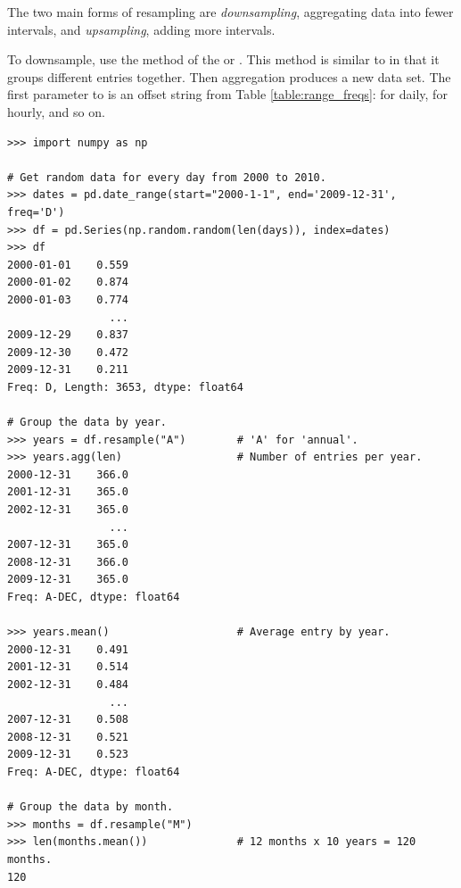 The two main forms of resampling are \emph{downsampling}, aggregating data into fewer intervals, and \emph{upsampling}, adding more intervals.

To downsample, use the  method of the  or .
This method is similar to  in that it groups different entries together.
Then aggregation produces a new data set.
The first parameter to  is an offset string from Table \ref{table:range_freqs}:  for daily,  for hourly, and so on.

\begin{lstlisting}
>>> import numpy as np

# Get random data for every day from 2000 to 2010.
>>> dates = pd.date_range(start="2000-1-1", end='2009-12-31', freq='D')
>>> df = pd.Series(np.random.random(len(days)), index=dates)
>>> df
2000-01-01    0.559
2000-01-02    0.874
2000-01-03    0.774
                ...
2009-12-29    0.837
2009-12-30    0.472
2009-12-31    0.211
Freq: D, Length: 3653, dtype: float64

# Group the data by year.
>>> years = df.resample("A")        # 'A' for 'annual'.
>>> years.agg(len)                  # Number of entries per year.
2000-12-31    366.0
2001-12-31    365.0
2002-12-31    365.0
                ...
2007-12-31    365.0
2008-12-31    366.0
2009-12-31    365.0
Freq: A-DEC, dtype: float64

>>> years.mean()                    # Average entry by year.
2000-12-31    0.491
2001-12-31    0.514
2002-12-31    0.484
                ...
2007-12-31    0.508
2008-12-31    0.521
2009-12-31    0.523
Freq: A-DEC, dtype: float64

# Group the data by month.
>>> months = df.resample("M")
>>> len(months.mean())              # 12 months x 10 years = 120 months.
120
\end{lstlisting}

